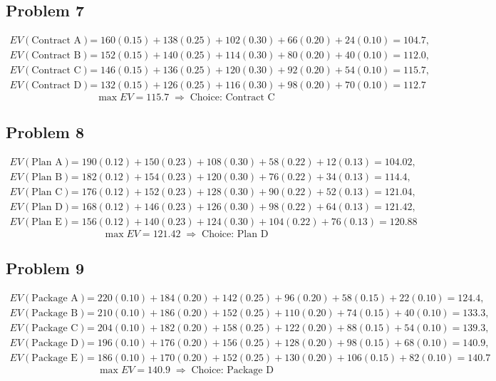 	\subsection*{Problem 7}
	\[
	\begin{aligned}
	EV(\text{Contract A}) &= 160(0.15)+138(0.25)+102(0.30)+66(0.20)+24(0.10)=104.7,\\
	EV(\text{Contract B}) &= 152(0.15)+140(0.25)+114(0.30)+80(0.20)+40(0.10)=112.0,\\
	EV(\text{Contract C}) &= 146(0.15)+136(0.25)+120(0.30)+92(0.20)+54(0.10)=115.7,\\
	EV(\text{Contract D}) &= 132(0.15)+126(0.25)+116(0.30)+98(0.20)+70(0.10)=112.7
	\end{aligned}
	\]
	\[
	\max EV = 115.7 \;\Rightarrow\; \text{Choice: Contract C}
	\]

	\subsection*{Problem 8}
	\[
	\begin{aligned}
	EV(\text{Plan A}) &= 190(0.12)+150(0.23)+108(0.30)+58(0.22)+12(0.13)=104.02,\\
	EV(\text{Plan B}) &= 182(0.12)+154(0.23)+120(0.30)+76(0.22)+34(0.13)=114.4,\\
	EV(\text{Plan C}) &= 176(0.12)+152(0.23)+128(0.30)+90(0.22)+52(0.13)=121.04,\\
	EV(\text{Plan D}) &= 168(0.12)+146(0.23)+126(0.30)+98(0.22)+64(0.13)=121.42,\\
	EV(\text{Plan E}) &= 156(0.12)+140(0.23)+124(0.30)+104(0.22)+76(0.13)=120.88
	\end{aligned}
	\]
	\[
	\max EV = 121.42 \;\Rightarrow\; \text{Choice: Plan D}
	\]

	\subsection*{Problem 9}
	\[
	\begin{aligned}
	EV(\text{Package A}) &= 220(0.10)+184(0.20)+142(0.25)+96(0.20)+58(0.15)+22(0.10)=124.4,\\
	EV(\text{Package B}) &= 210(0.10)+186(0.20)+152(0.25)+110(0.20)+74(0.15)+40(0.10)=133.3,\\
	EV(\text{Package C}) &= 204(0.10)+182(0.20)+158(0.25)+122(0.20)+88(0.15)+54(0.10)=139.3,\\
	EV(\text{Package D}) &= 196(0.10)+176(0.20)+156(0.25)+128(0.20)+98(0.15)+68(0.10)=140.9,\\
	EV(\text{Package E}) &= 186(0.10)+170(0.20)+152(0.25)+130(0.20)+106(0.15)+82(0.10)=140.7
	\end{aligned}
	\]
	\[
	\max EV = 140.9 \;\Rightarrow\; \text{Choice: Package D}
	\]

